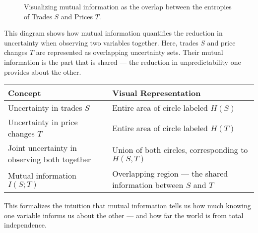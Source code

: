 \begin{figure}[H]
\centering
{}
\caption{Visualizing mutual information as the overlap between the entropies of Trades \( S \) and Prices \( T \).}
\end{figure}

\noindent
This diagram shows how mutual information quantifies the reduction in uncertainty when observing two variables together. Here, trades \( S \) and price changes \( T \) are represented as overlapping uncertainty sets. Their mutual information is the part that is shared — the reduction in unpredictability one provides about the other.

\begin{center}
\renewcommand{\arraystretch}{1.4}
\begin{tabular}{|p{5.2cm}|p{7.4cm}|}
\hline
\textbf{Concept} & \textbf{Visual Representation} \\
\hline
Uncertainty in trades \( S \) & Entire area of circle labeled \( H(S) \) \\
\hline
Uncertainty in price changes \( T \) & Entire area of circle labeled \( H(T) \) \\
\hline
Joint uncertainty in observing both together & Union of both circles, corresponding to \( H(S, T) \) \\
\hline
Mutual information \( I(S; T) \) & Overlapping region — the shared information between \( S \) and \( T \) \\
\hline
\end{tabular}
\end{center}

\vspace{1em}
\noindent
This formalizes the intuition that mutual information tells us how much knowing one variable informs us about the other — and how far the world is from total independence.



